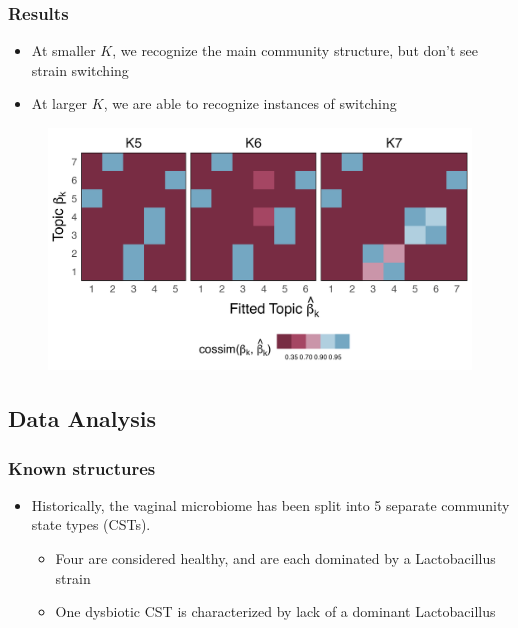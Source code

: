 \documentclass{beamer}
\begin{document}
\begin{frame}
  \frametitle{Results}
  \begin{itemize}
    \item At smaller $K$, we recognize the main community structure, but don't see strain switching
    \item At larger $K$, we are able to recognize instances of switching
  \end{itemize}
\begin{figure}
  \includegraphics[width=\textwidth]{equivalence_similarity_hm}
\end{figure}
\end{frame}

\subsection{Data Analysis}
\begin{frame}
  \frametitle{Known structures}
  \begin{itemize}
    \item Historically, the vaginal microbiome has been split into 5 separate
    community state types (CSTs).
    \begin{itemize}
      \item Four are considered healthy, and are each dominated by a Lactobacillus strain
      \item One dysbiotic CST is characterized by lack of a dominant Lactobacillus
    \end{itemize}
  \end{itemize}
\end{frame}
\end{document}
